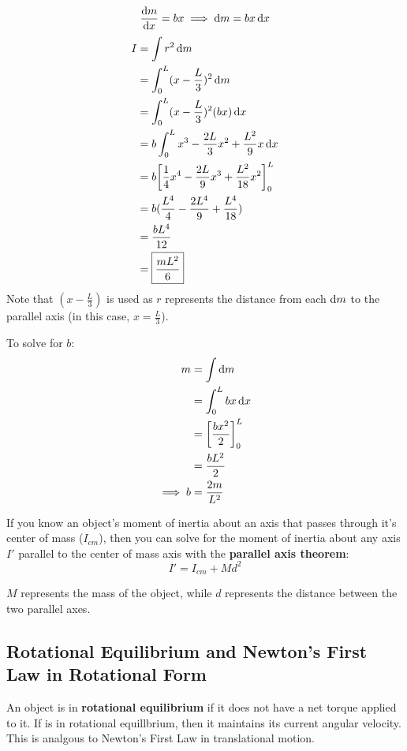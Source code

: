 \documentclass{article}
\begin{document}
\begin{answer}
    \[\odv{m}{x} = bx \implies \odif{m} = bx\odif{x}\]
    \begin{align*}
        I &= \int r^2 \odif{m} \\
        &= \int_{0}^{L} (x - \frac{L}{3})^2 \odif{m} \\
        &= \int_{0}^{L} (x - \frac{L}{3})^2 (bx) \odif{x} \\
        &= b \int_{0}^{L} x^3 - \frac{2L}{3}x^2 + \frac{L^2}{9}x \odif{x} \\
        &= b \bigg[\frac{1}{4}x^4 - \frac{2L}{9}x^3 + \frac{L^2}{18}x^2\bigg]_{0}^{L} \\
        &= b (\frac{L^4}{4} - \frac{2L^4}{9} + \frac{L^4}{18}) \\
        &= \frac{bL^4}{12} \\
        &= \boxed{\frac{mL^2}{6}}
    \end{align*}
    Note that $(x - \frac{L}{3})$ is used as $r$ represents the distance from each $\odif{m}$ to the parallel axis (in this case, $x = \frac{L}{3}$).

    To solve for $b$:
    \begin{align*}
        m &= \int \odif{m} \\
        &= \int_{0}^{L} bx\odif{x} \\
        &= \bigg[\frac{bx^2}{2}\bigg]_{0}^{L} \\
        &= \frac{bL^2}{2} \\
        \implies b &= \frac{2m}{L^2} 
    \end{align*}
\end{answer}

If you know an object's moment of inertia about an axis that passes through it's center of mass ($I_{cm}$),
then you can solve for the moment of inertia about any axis $I'$ parallel to the center of mass axis with the \textbf{parallel axis theorem}:
\[I' = I_{cm} + Md^2\]

$M$ represents the mass of the object, while $d$ represents the distance between the two parallel axes.

\subsection{Rotational Equilibrium and Newton's First Law in Rotational Form}

An object is in \textbf{rotational equilibrium} if it does not have a net torque applied to it.
If is in rotational equillbrium, then it maintains its current angular velocity.
This is analgous to Newton's First Law in translational motion.
\end{document}
